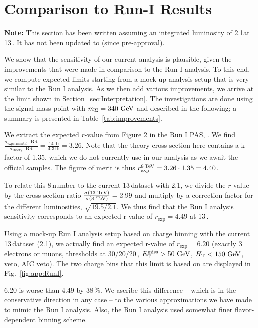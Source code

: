 \chapter{Comparison to Run-I Results}
\textbf{Note:} This section has been written assuming an integrated luminosity of 2.1\fbinv at 13\,\TeV. It has not been updated to \fullLumi (since pre-approval).

We show that the sensitivity of our current analysis is plausible, given the improvements that were made in comparison to the Run I analysis. To this end, we compute expected limits starting from a mock-up analysis setup that is very similar to the Run I analysis. As we then add various improvements, we arrive at the limit shown in Section~\ref{sec:Interpretation}. The investigations are done using the signal mass point with $m_\Sigma = 340\,\,\text{Ge\hspace{-.08em}V}$ and described in the following; a summary is presented in Table~\ref{tab:improvements}.

We extract the expected $r$-value from Figure 2 in the Run I PAS, \cite{CMS-PAS-EXO-14-001}. We find $\frac{\sigma_\textrm{experimental} \cdot \textrm{BR}}{\sigma_\textrm{theory} \cdot \textrm{BR}} = \frac{14\,\textrm{fb}}{4.3\,\textrm{fb}} = 3.26$. Note that the theory cross-section here contains a k-factor of 1.35, which we do not currently use in our analysis as we await the official samples. The figure of merit is thus $r_\textrm{exp}^{8\,\text{Te\hspace{-.08em}V}} = 3.26 \cdot 1.35 = 4.40$.

To relate this 8\,\TeV number to the current 13\,\TeV dataset with 2.1\fbinv, we divide the $r$-value by the cross-section ratio $\frac{\sigma(13\,\,\text{Te\hspace{-.08em}V})}{\sigma(8\,\,\text{Te\hspace{-.08em}V})} = 2.99$ and multiply by a correction factor for the different luminosities, $\sqrt{19.5/2.1}$. We thus find that the Run I analysis sensitivity corresponds to an expected r-value of $r_\textrm{exp} = 4.49$ at 13\,\TeV.

Using a mock-up Run I analysis setup based on charge binning with the current 13\,\TeV dataset (2.1\fbinv), we actually find an expected r-value of $r_\textrm{exp} = 6.20$ (exactly 3 electrons or muons, \pt thresholds at 30/20/20\,\GeV, $E_{\mathrm{T}}^{\text{miss}} > 50\,\,\text{Ge\hspace{-.08em}V}$, $H_{\mathrm{T}} < 150\,\,\text{Ge\hspace{-.08em}V}$, \Z veto, AIC veto). The two charge bins that this limit is based on are displayed in Fig.~\ref{fig:app:RunI}.

6.20 is worse than 4.49 by 38\,\%. We ascribe this difference -- which is in the conservative direction in any case -- to the various approximations we have made to mimic the Run I analysis. Also, the Run I analysis used somewhat finer flavor-dependent binning scheme.

